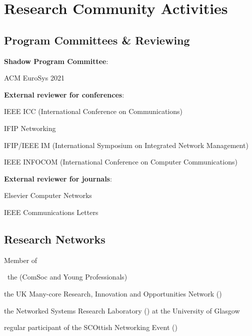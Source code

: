 \section{Research Community Activities}
\subsection{Program Committees \& Reviewing}
\begin{cvitemize}
	\item \textbf{Shadow Program Committee}:
	\begin{inlineItemize}
		\item ACM EuroSys 2021
	\end{inlineItemize}
	\item \textbf{External reviewer for conferences}:
	\begin{inlineItemize}
		\item IEEE ICC (International Conference on Communications)
		\item IFIP Networking
		\item IFIP/IEEE IM (International Symposium on Integrated Network Management)
		\item IEEE INFOCOM (International Conference on Computer Communications)
	\end{inlineItemize}
	\item \textbf{External reviewer for journals}:
	\begin{inlineItemize}
		\item Elsevier Computer Networks
		\item IEEE Communications Letters
	\end{inlineItemize}
\end{cvitemize}

\subsection{Research Networks}
\begin{cvitemize}
	\item Member of
	\begin{inlineItemize}
		\item \ the  (ComSoc and Young Professionals)
		\item the UK Many-core Research, Innovation and Opportunities Network ()
		\item the Networked Systems Research Laboratory () at the University of Glasgow
		\item regular participant of the SCOttish Networking Event ()
	\end{inlineItemize}
\end{cvitemize}